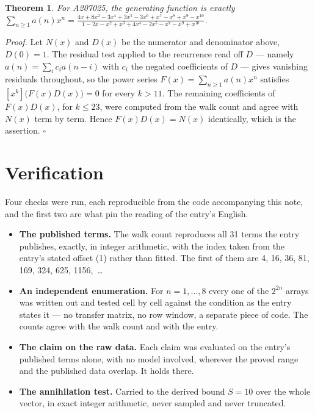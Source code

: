 \documentclass[11pt]{article}
\newtheorem{theorem}{Theorem}
\theoremstyle{definition}
\begin{document}
\begin{theorem} For A207025, the generating function is exactly $\sum_{n\ge 1} a(n)x^n = \frac{4x + 8x^{2} - 3x^{4} + 3x^{5} - 3x^{6} + x^{7} - x^{8} + x^{9} - x^{10}}{1 - 2x - x^{2} + x^{3} + 4x^{4} - 2x^{5} - x^{7} - x^{9} + x^{10}}$.\end{theorem}

{\itshape Proof.} Let $N(x)$ and $D(x)$ be the numerator and denominator above, $D(0)=1$. The residual test applied to the recurrence read off $D$ --- namely $a(n) = \sum_i c_i a(n-i)$ with $c_i$ the negated coefficients of $D$ --- gives vanishing residuals throughout, so the power series $F(x)=\sum_{n\ge 1}a(n)x^n$ satisfies $[x^k]\bigl(F(x)D(x)\bigr) = 0$ for every $k > 11$. The remaining coefficients of $F(x)D(x)$, for $k \le 23$, were computed from the walk count and agree with $N(x)$ term by term. Hence $F(x)D(x) = N(x)$ identically, which is the assertion. $\square$

\section{Verification}

Four checks were run, each reproducible from the code accompanying this note, and the first two are what pin the reading of the entry's English.

\begin{itemize}

\item {\bfseries The published terms.} The walk count reproduces all 31 terms the entry publishes, exactly, in integer arithmetic, with the index taken from the entry's stated offset (1) rather than fitted. The first of them are 4, 16, 36, 81, 169, 324, 625, 1156,~\dots

\item {\bfseries An independent enumeration.} For $n = 1,\dots,8$ every one of the $2^{2n}$ arrays was written out and tested cell by cell against the condition as the entry states it --- no transfer matrix, no row window, a separate piece of code. The counts agree with the walk count and with the entry.

\item {\bfseries The claim on the raw data.} Each claim was evaluated on the entry's published terms alone, with no model involved, wherever the proved range and the published data overlap. It holds there.

\item {\bfseries The annihilation test.} Carried to the derived bound $S = 10$ over the whole vector, in exact integer arithmetic, never sampled and never truncated.

\end{itemize}
\end{document}
